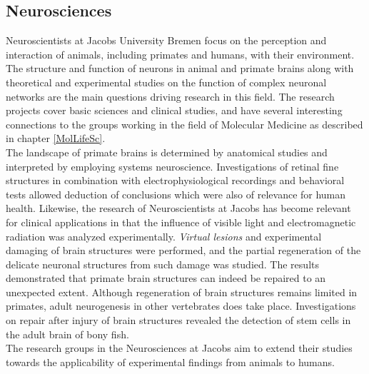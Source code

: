 \subsection{Neurosciences}

Neuroscientists at Jacobs University Bremen focus on the perception and interaction of animals, including primates and humans, with their environment. The structure and function of neurons in animal and primate brains along with theoretical and experimental studies on the function of complex neuronal networks are the main questions driving research in this field. The research projects cover basic sciences and clinical studies, and have several interesting connections to the groups working in the field of Molecular Medicine as described in chapter \ref{MolLifeSc}.\\ 

The landscape of primate brains is determined by anatomical studies and interpreted by employing systems neuroscience. Investigations of retinal fine structures in combination with electrophysiological recordings and behavioral tests allowed deduction of conclusions which were also of relevance for human health. Likewise, the research of Neuroscientists at Jacobs has become relevant for clinical applications in that the influence of visible light and electromagnetic radiation was analyzed experimentally. \textit{Virtual lesions} and experimental damaging of brain structures were performed, and the partial regeneration of the delicate neuronal structures from such damage was studied. The results demonstrated that primate brain structures can indeed be repaired to an unexpected extent. Although regeneration of brain structures remains limited in primates, adult neurogenesis in other vertebrates does take place. Investigations on repair after injury of brain structures revealed the detection of stem cells in the adult brain of bony fish. \\

The research groups in the Neurosciences at Jacobs aim to extend their studies towards the applicability of experimental findings from animals to humans.\\
